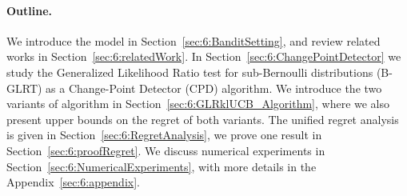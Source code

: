 



\paragraph{Outline.}
%
We introduce the model in Section~\ref{sec:6:BanditSetting}, and review related works in Section~\ref{sec:6:relatedWork}.
In Section~\ref{sec:6:ChangePointDetector} we study the Generalized Likelihood Ratio test for sub-Bernoulli distributions (B-GLRT) as a Change-Point Detector (CPD) algorithm.
We introduce the two variants of \GLRklUCB{} algorithm in Section~\ref{sec:6:GLRklUCB_Algorithm}, where we also present upper bounds on the regret of both variants.
The unified regret analysis is given in Section~\ref{sec:6:RegretAnalysis}, we prove one result in Section~\ref{sec:6:proofRegret}.
We discuss numerical experiments in Section~\ref{sec:6:NumericalExperiments}, with more details in the Appendix~\ref{sec:6:appendix}.

